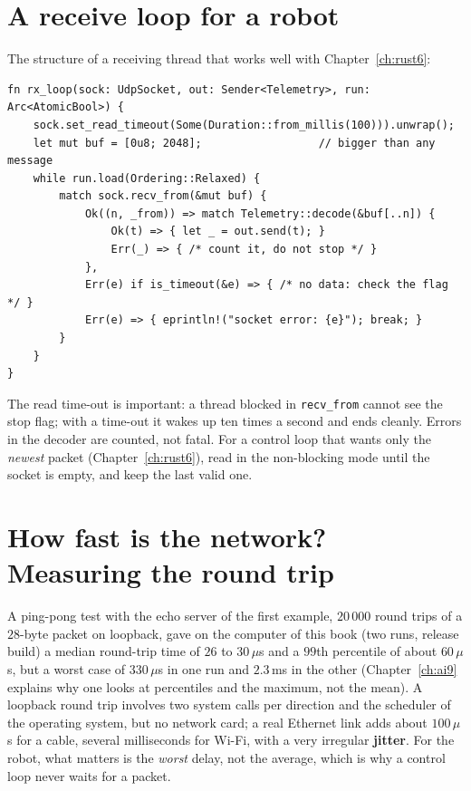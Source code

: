 \section*{A receive loop for a robot}
The structure of a receiving thread that works well with Chapter~\ref{ch:rust6}:
\begin{verbatim}
fn rx_loop(sock: UdpSocket, out: Sender<Telemetry>, run: Arc<AtomicBool>) {
    sock.set_read_timeout(Some(Duration::from_millis(100))).unwrap();
    let mut buf = [0u8; 2048];                  // bigger than any message
    while run.load(Ordering::Relaxed) {
        match sock.recv_from(&mut buf) {
            Ok((n, _from)) => match Telemetry::decode(&buf[..n]) {
                Ok(t) => { let _ = out.send(t); }
                Err(_) => { /* count it, do not stop */ }
            },
            Err(e) if is_timeout(&e) => { /* no data: check the flag */ }
            Err(e) => { eprintln!("socket error: {e}"); break; }
        }
    }
}
\end{verbatim}
The read time-out is important: a thread blocked in \verb!recv_from! cannot see the stop flag; with a time-out it wakes up ten times a second and ends cleanly. Errors in the decoder are counted, not fatal. For a control loop that wants only the \emph{newest} packet (Chapter~\ref{ch:rust6}), read in the non-blocking mode until the socket is empty, and keep the last valid one.

\section*{How fast is the network? Measuring the round trip}
A ping-pong test with the echo server of the first example, $20\,000$ round trips of a $28$-byte packet on loopback, gave on the computer of this book (two runs, release build) a median round-trip time of $26$ to $30\,\mu$s and a $99$th percentile of about $60\,\mu$s, but a worst case of $330\,\mu$s in one run and $2.3$\,ms in the other (Chapter~\ref{ch:ai9} explains why one looks at percentiles and the maximum, not the mean). A loopback round trip involves two system calls per direction and the scheduler of the operating system, but no network card; a real Ethernet link adds about $100\,\mu$s for a cable, several milliseconds for Wi-Fi, with a very irregular \textbf{jitter}. For the robot, what matters is the \emph{worst} delay, not the average, which is why a control loop never waits for a packet.


